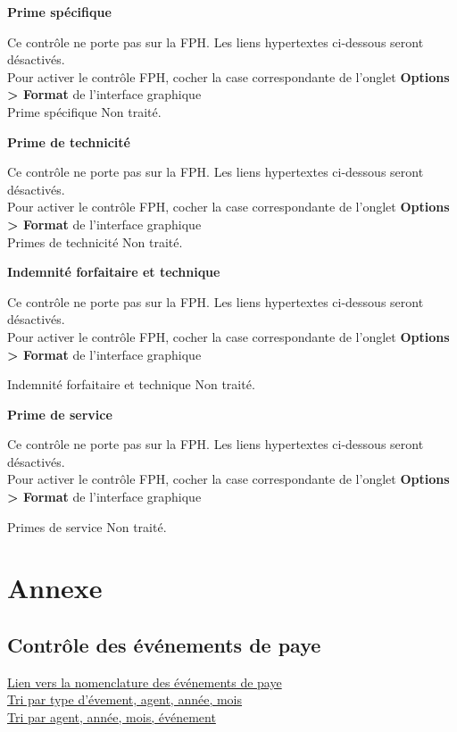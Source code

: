 \textbf{Prime spécifique}

Ce contrôle ne porte pas sur la FPH. Les liens hypertextes ci-dessous
seront désactivés.\\
Pour activer le contrôle FPH, cocher la case correspondante de l'onglet
\textbf{Options \textgreater{} Format} de l'interface graphique\\
Prime spécifique Non traité.

\textbf{Prime de technicité}

Ce contrôle ne porte pas sur la FPH. Les liens hypertextes ci-dessous
seront désactivés.\\
Pour activer le contrôle FPH, cocher la case correspondante de l'onglet
\textbf{Options \textgreater{} Format} de l'interface graphique\\
Primes de technicité Non traité.

\textbf{Indemnité forfaitaire et technique}

Ce contrôle ne porte pas sur la FPH. Les liens hypertextes ci-dessous
seront désactivés.\\
Pour activer le contrôle FPH, cocher la case correspondante de l'onglet
\textbf{Options \textgreater{} Format} de l'interface graphique

Indemnité forfaitaire et technique Non traité.

\textbf{Prime de service}

Ce contrôle ne porte pas sur la FPH. Les liens hypertextes ci-dessous
seront désactivés.\\
Pour activer le contrôle FPH, cocher la case correspondante de l'onglet
\textbf{Options \textgreater{} Format} de l'interface graphique

Primes de service Non traité.

\newpage

\hypertarget{annexe}{%
\section{Annexe}\label{annexe}}

\hypertarget{controle-des-evenements-de-paye}{%
\subsection{Contrôle des événements de
paye}\label{controle-des-evenements-de-paye}}

\href{../Bases/Fiabilite/Evenements.csv}{Lien vers la nomenclature des
événements de paye}\\
\href{../Bases/Fiabilite/Evenements.ind.csv}{Tri par type d'évement, agent,
année, mois}\\
\href{../Bases/Fiabilite/Evenements.mat.csv}{Tri par agent, année, mois,
événement}

